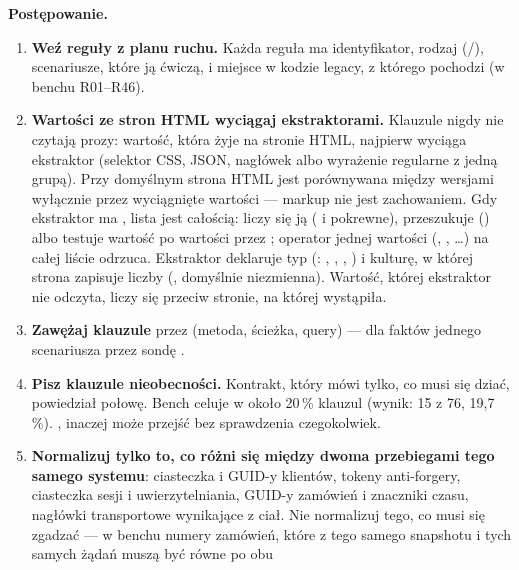 \textbf{Postępowanie.}
\begin{enumerate}
  \item \textbf{Weź reguły z planu ruchu.} Każda reguła ma identyfikator, rodzaj
        (/), scenariusze, które ją ćwiczą, i miejsce w kodzie
        legacy, z którego pochodzi (w benchu R01--R46).
  \item \textbf{Wartości ze stron HTML wyciągaj ekstraktorami.} Klauzule nigdy nie czytają
        prozy: wartość, która żyje na stronie HTML, najpierw wyciąga ekstraktor (selektor
        CSS, JSON, nagłówek albo wyrażenie regularne z jedną grupą). Przy domyślnym
         strona HTML jest porównywana między wersjami
        wyłącznie przez wyciągnięte wartości --- markup nie jest zachowaniem. Gdy
        ekstraktor ma , lista jest całością: liczy się ją
        ( i pokrewne), przeszukuje () albo testuje
        wartość po wartości przez \repopath{[*]}; operator jednej wartości
        (, , \ldots{}) na całej liście
         odrzuca. Ekstraktor deklaruje typ (:
        , , , )
        i kulturę, w której strona zapisuje liczby (, domyślnie
        niezmienna). Wartość, której ekstraktor nie odczyta, liczy się przeciw stronie, na
        której wystąpiła.
  \item \textbf{Zawężaj klauzule} przez  (metoda, ścieżka, query) --- dla
        faktów jednego scenariusza przez sondę .
  \item \textbf{Pisz klauzule nieobecności.} Kontrakt, który mówi tylko, co musi się
        dziać, powiedział połowę. Bench celuje w około 20\,\% klauzul 
        (wynik: 15 z 76, 19,7\,\%). , inaczej może przejść bez
        sprawdzenia czegokolwiek.
  \item \textbf{Normalizuj tylko to, co różni się między dwoma przebiegami tego samego
        systemu}: ciasteczka i GUID-y klientów, tokeny anti-forgery, ciasteczka sesji i
        uwierzytelniania, GUID-y zamówień i znaczniki czasu, nagłówki transportowe
        wynikające z ciał. Nie normalizuj tego, co musi się zgadzać --- w benchu numery
        zamówień, które z tego samego snapshotu i tych samych żądań muszą być równe po obu

\end{enumerate}
